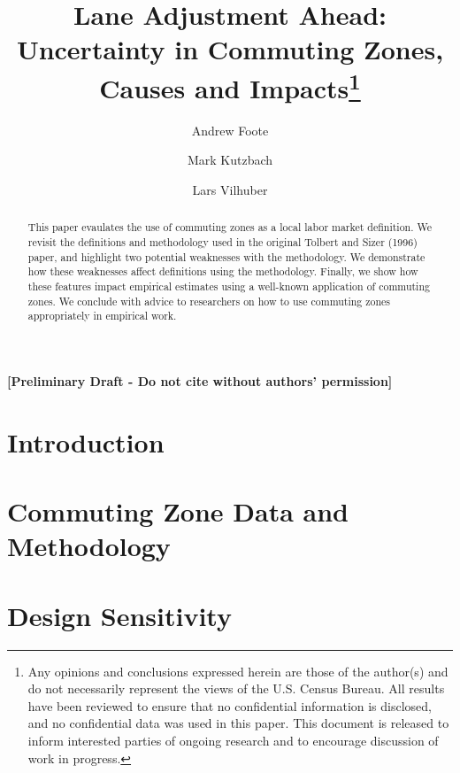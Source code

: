 \documentclass[12pt]{article}
\begin{document}
\title{Lane Adjustment Ahead: Uncertainty in Commuting Zones, Causes and Impacts\thanks{Any opinions and conclusions expressed herein are those of the author(s) and do not necessarily represent the views of the U.S. Census Bureau. All results have been reviewed to ensure that no confidential information is disclosed, and no confidential data was used in this paper. This document is released to inform interested parties of ongoing research and to encourage discussion of work in progress.}}
\author[1]{Andrew Foote}
\author[2]{Mark Kutzbach}
\author[1,3]{Lars Vilhuber}
\maketitle


\textbf{[Preliminary Draft - Do not cite without authors' permission]}


\begin{abstract}

This paper evaulates the use of commuting zones as a local labor market definition. We revisit the definitions and methodology used in the original Tolbert and Sizer (1996) paper,  and highlight two potential weaknesses with the methodology. We demonstrate how these weaknesses affect definitions using the methodology. Finally, we show how these features impact empirical estimates using a well-known application of commuting zones. We conclude with advice to researchers on how to use commuting zones appropriately in empirical work.
\end{abstract}


\doublespacing

\section{Introduction \label{sec:intro}}


\section{Commuting Zone Data and Methodology \label{sec:method}}


\section{Design Sensitivity \label{sec:dsens}}

\end{document}
